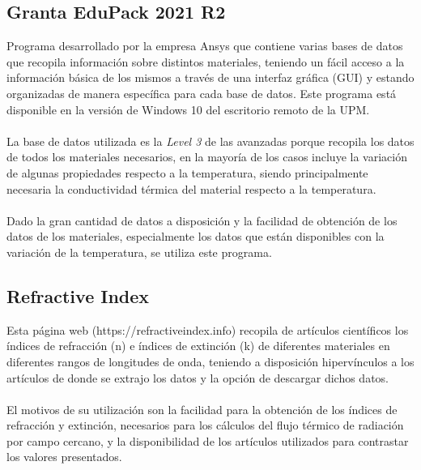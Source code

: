 \subsection{Granta EduPack 2021 R2}
Programa desarrollado por la empresa Ansys que contiene varias bases de datos que recopila información sobre distintos materiales, teniendo un fácil acceso a la información básica de los mismos a través de una interfaz gráfica (GUI) y estando organizadas de manera específica para cada base de datos. Este programa está disponible en la versión de Windows 10 del escritorio remoto de la UPM.\\\\
La base de datos utilizada es la \textit{Level 3} de las avanzadas porque recopila los datos de todos los materiales necesarios, en la mayoría de los casos incluye la variación de algunas propiedades respecto a la temperatura, siendo principalmente necesaria la conductividad térmica del material respecto a la temperatura.\\\\
Dado la gran cantidad de datos a disposición y la facilidad de obtención de los datos de los materiales, especialmente los datos que están disponibles con la variación de la temperatura, se utiliza este programa.
\subsection{Refractive Index}
Esta página web (https://refractiveindex.info) recopila de artículos científicos los índices de refracción (n) e índices de extinción (k) de diferentes materiales en diferentes rangos de longitudes de onda, teniendo a disposición hipervínculos a los artículos de donde se extrajo los datos y la opción de descargar dichos datos.\\\\
El motivos de su utilización son la facilidad para la obtención de los índices de refracción y extinción, necesarios para los cálculos del flujo térmico de radiación por campo cercano, y la disponibilidad de los artículos utilizados para contrastar los valores presentados.

